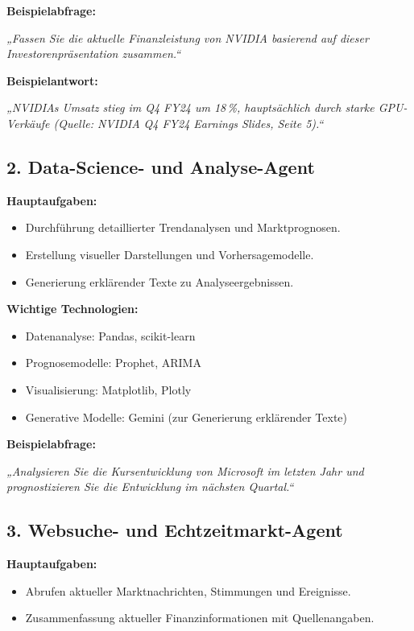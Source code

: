 \documentclass[12pt,a4paper]{article}
\begin{document}
\textbf{Beispielabfrage:}

\textit{„Fassen Sie die aktuelle Finanzleistung von NVIDIA basierend auf dieser Investorenpräsentation zusammen.“}

\textbf{Beispielantwort:}

\textit{„NVIDIAs Umsatz stieg im Q4 FY24 um 18\,\%, hauptsächlich durch starke GPU-Verkäufe (Quelle: NVIDIA Q4 FY24 Earnings Slides, Seite 5).“}

\subsection*{2. Data-Science- und Analyse-Agent}

\textbf{Hauptaufgaben:}
\begin{itemize}[noitemsep]
    \item Durchführung detaillierter Trendanalysen und Marktprognosen.
    \item Erstellung visueller Darstellungen und Vorhersagemodelle.
    \item Generierung erklärender Texte zu Analyseergebnissen.
\end{itemize}

\textbf{Wichtige Technologien:}
\begin{itemize}[noitemsep]
    \item Datenanalyse: Pandas, scikit-learn
    \item Prognosemodelle: Prophet, ARIMA
    \item Visualisierung: Matplotlib, Plotly
    \item Generative Modelle: Gemini (zur Generierung erklärender Texte)
\end{itemize}

\textbf{Beispielabfrage:}

\textit{„Analysieren Sie die Kursentwicklung von Microsoft im letzten Jahr und prognostizieren Sie die Entwicklung im nächsten Quartal.“}

\subsection*{3. Websuche- und Echtzeitmarkt-Agent}

\textbf{Hauptaufgaben:}
\begin{itemize}[noitemsep]
    \item Abrufen aktueller Marktnachrichten, Stimmungen und Ereignisse.
    \item Zusammenfassung aktueller Finanzinformationen mit Quellenangaben.
\end{itemize}
\end{document}
